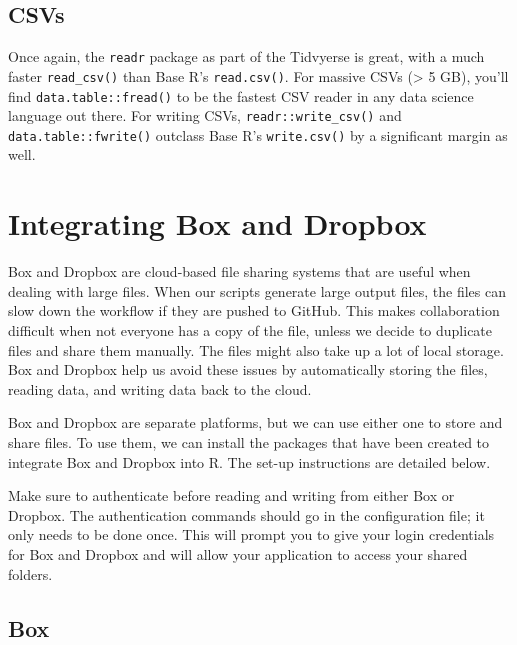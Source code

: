 \documentclass[
]{book}
\begin{document}
\hypertarget{csvs}{%
\subsection{CSVs}\label{csvs}}

Once again, the \texttt{readr} package as part of the Tidvyerse is great, with a much faster \texttt{read\_csv()} than Base R's \texttt{read.csv()}. For massive CSVs (\textgreater{} 5 GB), you'll find \texttt{data.table::fread()} to be the fastest CSV reader in any data science language out there. For writing CSVs, \texttt{readr::write\_csv()} and \texttt{data.table::fwrite()} outclass Base R's \texttt{write.csv()} by a significant margin as well.

\hypertarget{integrating-box-and-dropbox}{%
\section{Integrating Box and Dropbox}\label{integrating-box-and-dropbox}}

Box and Dropbox are cloud-based file sharing systems that are useful when dealing with large files. When our scripts generate large output files, the files can slow down the workflow if they are pushed to GitHub. This makes collaboration difficult when not everyone has a copy of the file, unless we decide to duplicate files and share them manually. The files might also take up a lot of local storage. Box and Dropbox help us avoid these issues by automatically storing the files, reading data, and writing data back to the cloud.

Box and Dropbox are separate platforms, but we can use either one to store and share files. To use them, we can install the packages that have been created to integrate Box and Dropbox into R. The set-up instructions are detailed below.

Make sure to authenticate before reading and writing from either Box or Dropbox. The authentication commands should go in the configuration file; it only needs to be done once. This will prompt you to give your login credentials for Box and Dropbox and will allow your application to access your shared folders.

\hypertarget{box}{%
\subsection{Box}\label{box}}
\end{document}
